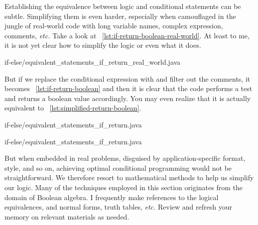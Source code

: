Establishing the equivalence between logic and conditional statements can be subtle.
Simplifying them is even harder, especially when camouflaged in the
jungle of real-world code with long variable names, complex expression, comments, \textit{etc.}
Take a look at ~\autoref{lst:if-return-boolean-real-world}.
At least to me, it is not yet clear how to simplify the logic or even what it does.
\begin{clisting}
    
    {if-else/equivalent_statements_if_return_real_world.java}
\end{clisting}
But if we replace the conditional expression with  and filter out the
comments, it becomes ~\autoref{lst:if-return-boolean} and then
it is clear that the code performs a test and returns a boolean value accordingly.
You may even realize that it is actually equivalent to ~\autoref{lst:simplified-return-boolean}.
\begin{clisting}
    \begin{minipage}[t]{.45\textwidth}
        
        {if-else/equivalent_statements_if_return.java}
    \end{minipage}
    \hfill
    \begin{minipage}[t]{.45\textwidth}
        
        {if-else/equivalent_statements_if_return.java}
    \end{minipage}
\end{clisting}
But when embedded in real problems, disguised by application-specific format, style, and so on,
achieving optimal conditional programming would not be straightforward.
%        
%        
We therefore resort to mathematical methods to help us simplify our logic.
Many of the techniques employed in this section originates from the domain of Boolean algebra.
I frequently make references to the logical equivalences, and normal forms, truth tables,
\textit{etc.}
Review and refresh your memory on relevant materials as needed.

